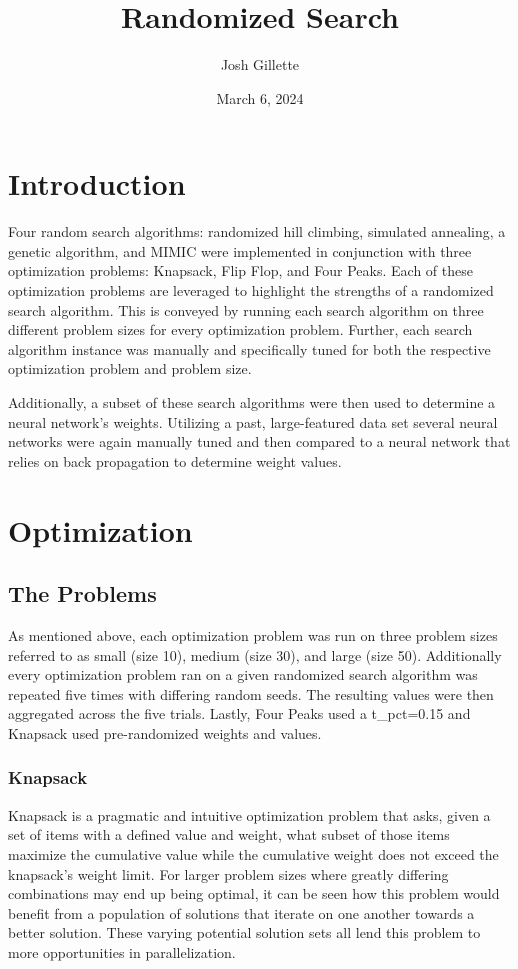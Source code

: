 \documentclass{article}
\title{Randomized Search}
\author{Josh Gillette}
\date{March 6, 2024}
\begin{document}
\maketitle

\section{Introduction}
Four random search algorithms: randomized hill climbing, simulated annealing, a genetic algorithm, and MIMIC were implemented in conjunction with three optimization problems: Knapsack, Flip Flop, and Four Peaks. Each of these optimization problems are leveraged to highlight the strengths of a randomized search algorithm. This is conveyed by running each search algorithm on three different problem sizes for every optimization problem. Further, each search algorithm instance was manually and specifically tuned for both the respective optimization problem and problem size.

Additionally, a subset of these search algorithms were then used to determine a neural network's weights. Utilizing a past, large-featured data set several neural networks were again manually tuned and then compared to a neural network that relies on back propagation to determine weight values.

\section{Optimization}

\subsection{The Problems}

As mentioned above, each optimization problem was run on three problem sizes referred to as small (size 10), medium (size 30), and large (size 50). Additionally every optimization problem ran on a given randomized search algorithm was repeated five times with differing random seeds. The resulting values were then aggregated across the five trials. Lastly, Four Peaks used a t\_pct=0.15 and Knapsack used pre-randomized weights and values.
\subsubsection{Knapsack}
Knapsack is a pragmatic and intuitive optimization problem that asks, given a set of items with a defined value and weight, what subset of those items maximize the cumulative value while the cumulative weight does not exceed the knapsack's weight limit. For larger problem sizes where greatly differing combinations may end up being optimal, it can be seen how this problem would benefit from a population of solutions that iterate on one another towards a better solution. These varying potential solution sets all lend this problem to more opportunities in parallelization.
\end{document}
